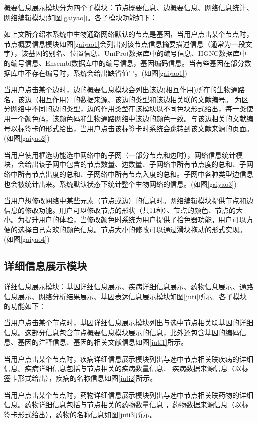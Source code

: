 概要信息展示模块分为四个子模块：节点概要信息、边概要信息、网络信息统计、网络编辑模块(如图\ref{gaiyao})。各子模块功能如下：

如上文所介绍本系统中生物通路网络默认的节点是基因，当用户点击某个节点时，节点概要信息模块如图\ref{gaiyao1}会列出对该节点信息摘要描述信息（通常为一段文字），该基因的别名、位置信息、UniProt\cite{}数据库中的编号信息、HGNC\cite{}数据库中的编号信息、Ensembl\cite{}数据库中的编号信息，基因编码信息。当有些基因在部分数据库中不存在编号时，系统会给出缺省值'-'。(如图\ref{gaiyao1})

当用户点击某个边时，边的概要信息模块会列出该边(相互作用)所在的生物通路名，该边（相互作用）的数据来源、该边的类型和该边相关联的文献编号。 为区分网络中不同的边的类型，边的作用类型在该模块以不同色块形式给出，每一类使用一个颜色码，该颜色码和生物通路网络中该边的颜色一致。与该边相关的文献编号以标签卡的形式给出，当用户点击该标签卡时系统会跳转到该文献来源的页面。(如图\ref{gaiyao2})

当用户使用框选功能选中网络中的子网（一部分节点和边时），网络信息统计模块，会给出该子网中包含的节点数量、边数量、子网络中所有节点度的总和、子网络中所有节点出度的总和、子网络中所有节点入度的总和。子网中各种类型边信息也会被统计出来。系统默认状态下统计整个生物网络的信息。(如图\ref{gaiyao3})

当用户想修改网络中某些元素（节点或边）的信息时。网络编辑模块提供节点和边信息的修改功能。用户可以修改节点的形状（共11种）、节点的颜色、节点的大小。为提升用户的体验，当修改颜色时系统为用户提供了拾色器功能，用户可以方便的选择自己喜欢的颜色信息。节点大小的修改可以通过滑块拖动的形式实现。(如图\ref{gaiyao4})

\subsection{详细信息展示模块}
详细信息展示模块：基因详细信息展示、疾病详细信息展示、药物信息展示、通路信息展示、网络分析结果展示、基因表达信息展示模块如图\ref{juti}所示。各子模块的功能如下：

当用户点击某个节点时，基因详细信息展示模块列出与选中节点相关联基因的详细信息。这部分信息包含节点概要信息模块展示的信息，此外还包含基因的编码信息、基因的注释信息、基因的相关文献信息如图\ref{juti1}所示。

当用户点击某个节点时，疾病详细信息展示模块列出与选中节点相关联疾病的详细信息。疾病详细信息包括与节点相关的疾病数量信息、
疾病数据来源信息（以标签卡形式给出），疾病的名称信息如图\ref{juti2}所示。

当用户点击某个节点时，药物详细信息展示模块列出与选中节点相关联药物的详细信息。药物详细信息包括与节点相关的药物数量信息
，药物数据来源信息（以标签卡形式给出），药物的名称信息如图\ref{juti3}所示。

